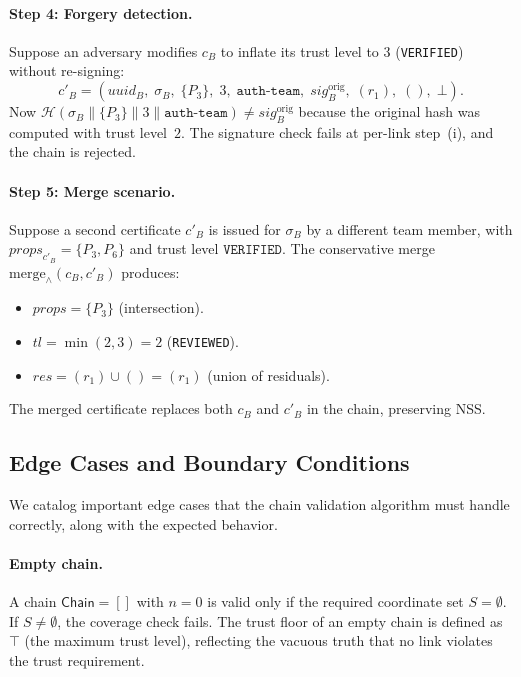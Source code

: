 \documentclass[11pt]{article}
\newcommand{\Chain}{\mathsf{Chain}}            %
\newcommand{\certprops}{\mathit{props}}        %
\newcommand{\certtrust}{\mathit{tl}}           %
\newcommand{\certsig}{\mathit{sig}}            %
\newcommand{\certresid}{\mathit{res}}          %
\newcommand{\Sigalg}{\mathcal{H}}              %
\renewcommand{\merge}{\mathrm{merge}}            %
\begin{document}
\paragraph{Step 4: Forgery detection.}
Suppose an adversary modifies $c_B$ to inflate its trust level to $3$
(\texttt{VERIFIED}) without re-signing:
\[
  c'_B = (\mathit{uuid}_B,\; \sigma_B,\; \{P_3\},\; 3,\; \texttt{auth-team},\;
           \certsig_B^{\mathrm{orig}},\; (r_1),\; (),\; \bot).
\]
Now $\Sigalg(\sigma_B \| \{P_3\} \| 3 \| \texttt{auth-team}) \ne \certsig_B^{\mathrm{orig}}$
because the original hash was computed with trust level~$2$.
The signature check fails at per-link step~(i), and the chain is rejected.

\paragraph{Step 5: Merge scenario.}
Suppose a second certificate $c'_B$ is issued for $\sigma_B$ by a different
team member, with $\certprops_{c'_B} = \{P_3, P_6\}$ and trust level
$\texttt{VERIFIED}$.  The conservative merge
$\merge_{\wedge}(c_B, c'_B)$ produces:
\begin{itemize}
  \item $\certprops = \{P_3\}$ (intersection).
  \item $\certtrust = \min(2, 3) = 2$ (\texttt{REVIEWED}).
  \item $\certresid = (r_1) \cup () = (r_1)$ (union of residuals).
\end{itemize}
The merged certificate replaces both $c_B$ and $c'_B$ in the chain,
preserving NSS.

\subsection{Edge Cases and Boundary Conditions}\label{sec:edge-cases}

We catalog important edge cases that the chain validation algorithm
must handle correctly, along with the expected behavior.

\paragraph{Empty chain.}
A chain $\Chain = []$ with $n = 0$ is valid only if the required
coordinate set $S = \emptyset$.  If $S \ne \emptyset$, the coverage
check fails.  The trust floor of an empty chain is defined as
$\top$ (the maximum trust level), reflecting the vacuous truth that
no link violates the trust requirement.
\end{document}
